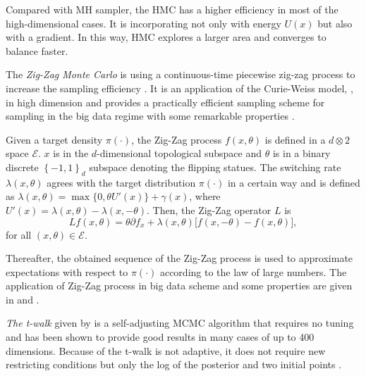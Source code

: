 Compared with MH sampler, the HMC has a higher efficiency in most of the high-dimensional cases. It is incorporating not only with energy $U(x)$ but also with a gradient. In this way, HMC explores a larger area and converges to balance faster. 


The \textit{Zig-Zag Monte Carlo} is using a continuous-time piecewise zig-zag process to increase the sampling efficiency \cite{bierkens2016piecewise}. It is an application of the Curie-Weiss model, \cite{turitsyn2011irreversible}, in high dimension and provides a practically efficient sampling scheme for sampling in the big data regime with some remarkable properties \cite{bierkens2017limit}. 

Given a target density $\pi(\cdot)$, the Zig-Zag process $f(x,\theta)$ is defined in a $d \otimes 2$ space $\mathcal{E}$. $x$ is in the $d$-dimensional topological subspace and $\theta$ is in a binary discrete $\left\lbrace -1,1\right\rbrace_d$ subspace denoting the flipping statues. The switching rate $\lambda(x,\theta)$ agrees with the target distribution $\pi(\cdot)$ in a certain way and is defined as $\lambda(x,\theta) = \max \lbrace 0,\theta U'(x) \rbrace +\gamma(x)$, where $U'(x)  = \lambda(x,\theta) - \lambda(x,-\theta)$. Then, the Zig-Zag operator $L$ is 
\begin{equation*}
Lf(x,\theta)=\theta\partial f_x+\lambda(x,\theta)\lbrack f(x,-\theta)-f(x,\theta )\rbrack,
\end{equation*}
for all $(x,\theta)\in \mathcal{E}$. 

Thereafter, the obtained sequence of the Zig-Zag process is used to approximate expectations with respect to $\pi(\cdot)$ according to the law of large numbers. 
The application of Zig-Zag process in big data scheme and some properties are given in \cite{bierkens2017limit} and \cite{bierkens2016zig}.




\textit{The t-walk} given by \cite{christen2010general} is a self-adjusting MCMC algorithm that requires no tuning and has been shown to provide good results in many cases of up to 400 dimensions. Because of the t-walk is not adaptive, it does not require new restricting conditions but only the log of the posterior and two initial points \cite{blaauw2011flexible}. 

